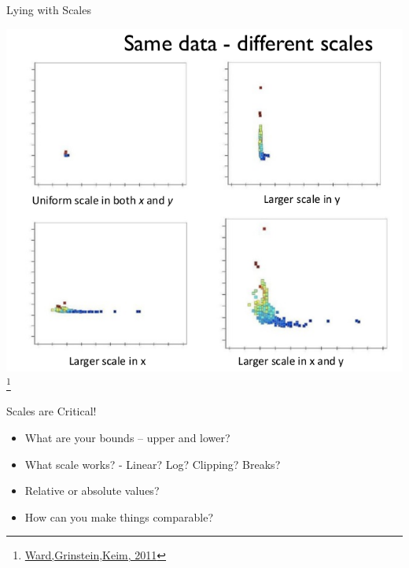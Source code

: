 \documentclass{beamer}
\newcommand{\furl}[1]{{\footnote{\url{#1}}}}
\begin{document}
\begin{frame}{Lying with Scales}
    \begin{center}
        \includegraphics[scale=0.34]{lyingWithScales.png}\furl{Ward,Grinstein,Keim, 2011}
    \end{center} 
\end{frame}

\begin{frame}{Scales are Critical!} 
    \begin{itemize}
        \item What are your bounds – upper and lower?
        \item What scale works? - Linear? Log? Clipping? Breaks?    
        \item Relative or absolute values?
        \item How can you make things comparable?   
    \end{itemize}
\end{frame}  
\end{document}

